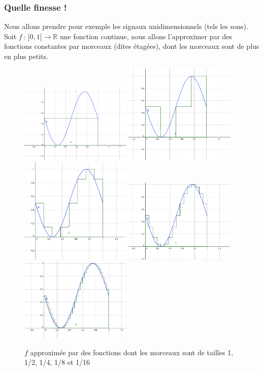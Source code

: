 \documentclass[]{article}
\theoremstyle{remark}
\theoremstyle{definition}
\newcommand{\funcshort}[3]{
	#1 \, : \, #2 \longrightarrow #3
}
\begin{document}
	\subsubsection*{Quelle finesse !}
	
	Nous allons prendre pour exemple les signaux unidimensionnels (tels les sons). Soit $\funcshort{f}{[0, 1[}{\mathbb{R}}$ une fonction continue, nous allons l'approximer par des fonctions constantes par morceaux (dites étagées), dont les morceaux sont de plus en plus petits.
	
	\begin{figure}[h]
		\centering
		\includegraphics[width=150pt]{sin_1.png}
		\includegraphics[width=150pt]{sin_2.png}
		\includegraphics[width=150pt]{sin_4.png}
		\includegraphics[width=150pt]{sin_8.png}
		\includegraphics[width=150pt]{sin_16.png}
		\caption{$f$ approximée par des fonctions dont les morceaux sont de tailles 1, 1/2, 1/4, 1/8 et 1/16}
	\end{figure}
	
\end{document}
